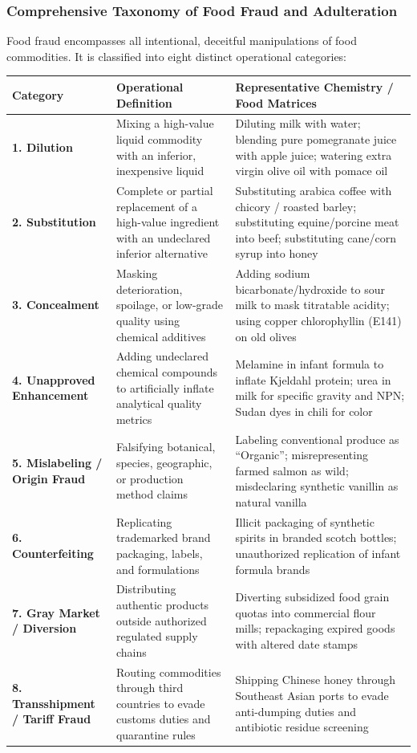 \documentclass[11pt,a4paper,oneside]{article}
\begin{document}
\subsubsection{Comprehensive Taxonomy of Food Fraud and Adulteration}
Food fraud encompasses all intentional, deceitful manipulations of food commodities. It is classified into eight distinct operational categories:

\begin{center}
\begin{tabular}{@{}p{3.6cm} p{5.4cm} p{6.8cm}@{}}
\toprule
\textbf{Category} & \textbf{Operational Definition} & \textbf{Representative Chemistry / Food Matrices} \tabularnewline
\midrule
\textbf{1. Dilution} & Mixing a high-value liquid commodity with an inferior, inexpensive liquid & Diluting milk with water; blending pure pomegranate juice with apple juice; watering extra virgin olive oil with pomace oil \tabularnewline
\textbf{2. Substitution} & Complete or partial replacement of a high-value ingredient with an undeclared inferior alternative & Substituting arabica coffee with chicory / roasted barley; substituting equine/porcine meat into beef; substituting cane/corn syrup into honey \tabularnewline
\textbf{3. Concealment} & Masking deterioration, spoilage, or low-grade quality using chemical additives & Adding sodium bicarbonate/hydroxide to sour milk to mask titratable acidity; using copper chlorophyllin (E141) on old olives \tabularnewline
\textbf{4. Unapproved Enhancement} & Adding undeclared chemical compounds to artificially inflate analytical quality metrics & Melamine in infant formula to inflate Kjeldahl protein; urea in milk for specific gravity and NPN; Sudan dyes in chili for color \tabularnewline
\textbf{5. Mislabeling / Origin Fraud} & Falsifying botanical, species, geographic, or production method claims & Labeling conventional produce as ``Organic''; misrepresenting farmed salmon as wild; misdeclaring synthetic vanillin as natural vanilla \tabularnewline
\textbf{6. Counterfeiting} & Replicating trademarked brand packaging, labels, and formulations & Illicit packaging of synthetic spirits in branded scotch bottles; unauthorized replication of infant formula brands \tabularnewline
\textbf{7. Gray Market / Diversion} & Distributing authentic products outside authorized regulated supply chains & Diverting subsidized food grain quotas into commercial flour mills; repackaging expired goods with altered date stamps \tabularnewline
\textbf{8. Transshipment / Tariff Fraud} & Routing commodities through third countries to evade customs duties and quarantine rules & Shipping Chinese honey through Southeast Asian ports to evade anti-dumping duties and antibiotic residue screening \tabularnewline
\bottomrule
\end{tabular}
\end{center}
\end{document}
